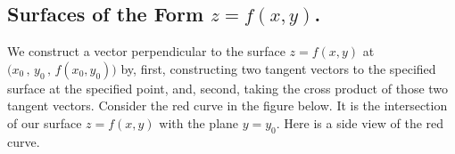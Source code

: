 \subsection{Surfaces of the Form $z=f(x,y)$.}
We construct a vector perpendicular to the surface $z=f(x,y)$ at
$\big(x_0\,,\,y_0\,,\,f(x_0,y_0)\big)$
by, first, constructing two tangent vectors to the specified surface at 
the specified point, and, second, taking the cross product
of those two tangent vectors. Consider the red curve in the figure
below. It is the intersection of our surface $z=f(x,y)$
with the plane $y=y_0$. Here is a side view of the red curve. 
